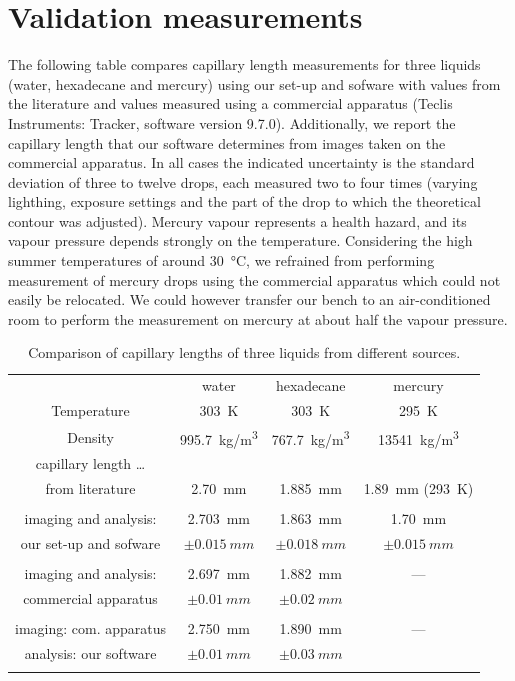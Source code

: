 \documentclass[fleqn]{scrartcl}
\begin{document}
\section{Validation measurements}
\label{sec:validation}

The following table compares capillary length measurements for three
liquids (water, hexadecane and mercury) using our set-up and sofware
with values from the literature and values measured using a commercial
apparatus (Teclis Instruments: Tracker, software version 9.7.0).
Additionally, we report the capillary length that our software
determines from images taken on the commercial apparatus. In all cases
the indicated uncertainty is the standard deviation of three to twelve
drops, each measured two to four times (varying lighthing, exposure
settings and the part of the drop to which the theoretical contour was
adjusted). Mercury vapour represents a health hazard, and its vapour
pressure depends strongly on the temperature\cite{mercury}.
Considering the high summer temperatures of around \SI{30}{\celsius},
we refrained from performing measurement of mercury drops using the
commercial apparatus which could not easily be relocated. We could
however transfer our bench to an air-conditioned room to perform the
measurement on mercury at about half the vapour pressure.

\begin{table}
  \begin{tabular}{c|c c c}
    & water & hexadecane & mercury \\
    Temperature & \SI{303}{K} & \SI{303}{K} & \SI{295}{K} \\
    Density & \SI{995.7}{kg/m^3}\cite{danslax} & \SI{767.7}{kg/m^3}\cite{rho_hexadecane} & \SI{13541}{kg/m^3}\cite{danslax} \\
    \hline
    capillary length \dots \\
    from literature &
    \SI{2.70}{mm}\cite{danslax}
    & \SI{1.885}{mm}\cite{gamma_hexadecane} &
    \SI{1.89}{mm} (\SI{293}{\kelvin})\cite{danslax}
    \\\\
    imaging and analysis: & \SI{2.703}{mm} & \SI{1.863}{mm} & \SI{1.70}{mm} \\
    our set-up and sofware & $ \pm \SI{0.015}{mm} $ & $ \pm \SI{0.018}{mm} $ & $ \pm \SI{0.015}{mm} $ \\\\
    imaging and analysis: & \SI{2.697}{mm} & \SI{1.882}{mm} & --- \\
    commercial apparatus & $ \pm \SI{0.01}{mm} $ & $\pm \SI{0.02}{mm} $ \\\\
    imaging: com. apparatus & \SI{2.750}{mm} & \SI{1.890}{mm} & --- \\
    analysis: our software & $\pm \SI{0.01}{mm} $ & $\pm \SI{0.03}{mm} $ \\\\
  \end{tabular}
  \caption{Comparison of capillary lengths of three liquids from different sources.}
\end{table}
\end{document}
